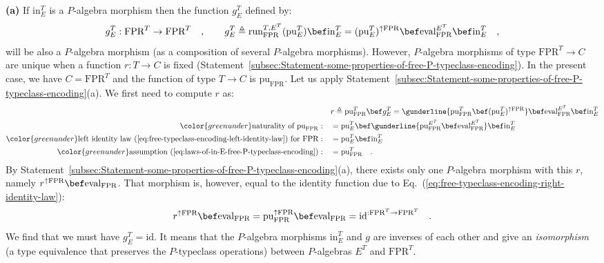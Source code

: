 \textbf{(a)} If $\text{in}_{E}^{T}$ is a $P$-algebra morphism then
the function $g_{E}^{T}$ defined by:
\[
g_{E}^{T}:\text{FPR}^{T}\rightarrow\text{FPR}^{T}\quad,\quad\quad g_{E}^{T}\triangleq\text{run}_{\text{FPR}}^{T,E^{T}}(\text{pu}_{E}^{T})\bef\text{in}_{E}^{T}=(\text{pu}_{E}^{T})^{\uparrow\text{FPR}}\bef\text{eval}_{\text{FPR}}^{E^{T}}\bef\text{in}_{E}^{T}\quad,
\]
will be also a $P$-algebra morphism (as a composition of several
$P$-algebra morphisms). However, $P$-algebra morphisms of type $\text{FPR}^{T}\rightarrow C$
are unique when a function $r:T\rightarrow C$ is fixed (Statement~\ref{subsec:Statement-some-properties-of-free-P-typeclass-encoding}).
In the present case, we have $C=\text{FPR}^{T}$ and the function
of type $T\rightarrow C$ is $\text{pu}_{\text{FPR}}$. Let us apply
Statement~\ref{subsec:Statement-some-properties-of-free-P-typeclass-encoding}(a).
We first need to compute $r$ as: 
\begin{align*}
 & r\triangleq\text{pu}_{\text{FPR}}^{T}\bef g_{E}^{T}=\gunderline{\text{pu}_{\text{FPR}}^{T}\bef(\text{pu}_{E}^{T})^{\uparrow\text{FPR}}}\bef\text{eval}_{\text{FPR}}^{E^{T}}\bef\text{in}_{E}^{T}\\
{\color{greenunder}\text{naturality of }\text{pu}_{\text{FPR}}:}\quad & =\text{pu}_{E}^{T}\bef\gunderline{\text{pu}_{\text{FPR}}^{E^{T}}\bef\text{eval}_{\text{FPR}}^{E^{T}}}\bef\text{in}_{E}^{T}\\
{\color{greenunder}\text{left identity law~(\ref{eq:free-typeclass-encoding-left-identity-law}) for }\text{FPR}:}\quad & =\text{pu}_{E}^{T}\bef\text{in}_{E}^{T}\\
{\color{greenunder}\text{assumption~(\ref{eq:laws-of-in-E-free-P-typeclass-encoding})}:}\quad & =\text{pu}_{\text{FPR}}^{T}\quad.
\end{align*}
By Statement~\ref{subsec:Statement-some-properties-of-free-P-typeclass-encoding}(a),
there exists only one $P$-algebra morphism with this $r$, namely
$r^{\uparrow\text{FPR}}\bef\text{eval}_{\text{FPR}}$. That morphism
is, however, equal to the identity function due to Eq.~(\ref{eq:free-typeclass-encoding-right-identity-law}):
\[
r^{\uparrow\text{FPR}}\bef\text{eval}_{\text{FPR}}=\text{pu}_{\text{FPR}}^{\uparrow\text{FPR}}\bef\text{eval}_{\text{FPR}}=\text{id}^{:\text{FPR}^{T}\rightarrow\text{FPR}^{T}}\quad.
\]
We find that we must have $g_{E}^{T}=\text{id}$. It means that the
$P$-algebra morphisms $\text{in}_{E}^{T}$ and $g$ are inverses
of each other and give an \emph{isomorphism} (a type equivalence that
preserves the $P$-typeclass operations) between $P$-algebras $E^{T}$
and $\text{FPR}^{T}$. 

